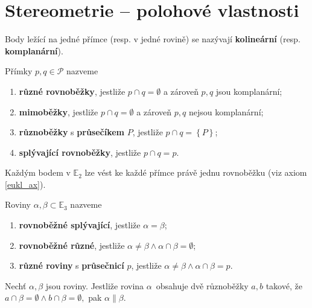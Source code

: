 \section{Stereometrie -- polohové vlastnosti}

\begin{definition}
    Body ležící na jedné přímce (resp. v jedné rovině) se nazývají \textbf{kolineární}
    (resp. \textbf{komplanární}).
\end{definition}

\begin{definition}
    Přímky $p,q \in \mathscr P$ nazveme
    \begin{enumerate}[$i.$]
        \item \textbf{různé rovnoběžky}, jestliže $p\cap q = \emptyset$ a zároveň $p,q$ jsou komplanární;
        \item \textbf{mimoběžky}, jestliže $p\cap q = \emptyset$ a zároveň $p,q$ nejsou komplanární;
        \item \textbf{různoběžky} s \textbf{průsečíkem} $P$, jestliže $p\cap q = \left \{ P \right \} $;
       	\item \textbf{splývající rovnoběžky}, jestliže $p\cap q = p$.
    \end{enumerate}
\end{definition}

\begin{pozn}
    Každým bodem v $\mathbb E_2$ lze vést ke každé přímce právě jednu rovnoběžku (viz axiom \ref{eukl_ax}).
\end{pozn}

\begin{definition}
    Roviny $\alpha,\beta \subset \mathbb E_3$ nazveme
    \begin{enumerate}[$i.$]
        \item \textbf{rovnoběžné splývající}, jestliže $\alpha = \beta$;
        \item \textbf{rovnoběžné různé}, jestliže $\alpha \ne \beta \land \alpha \cap
        \beta = \emptyset$;
        \item \textbf{různé roviny} s \textbf{průsečnicí} $p$, jestliže $\alpha
        \ne \beta \land \alpha \cap \beta = p$.
    \end{enumerate}
\end{definition}

\begin{veta}
    Nechť $\alpha, \beta$ jsou roviny. Jestliže rovina $\alpha$~obsahuje dvě různoběžky
    $a,b$ takové, že $a\cap \beta = \emptyset \land b \cap \beta = \emptyset,$
    pak $\alpha \parallel \beta.$
\end{veta}

